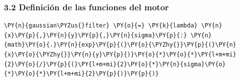 \subsubsection{3.2 Definición de las funciones del
motor}\label{definiciuxf3n-de-las-funciones-del-motor}

    \begin{tcolorbox}[breakable, size=fbox, boxrule=1pt, pad at break*=1mm,colback=cellbackground, colframe=cellborder]
\begin{Verbatim}[commandchars=\\\{\}]
\PY{n}{gaussian\PYZus{}filter} \PY{o}{=} \PY{k}{lambda} \PY{n}{x}\PY{p}{,}\PY{n}{y}\PY{p}{,}\PY{n}{sigma}\PY{p}{:} \PY{n}{math}\PY{o}{.}\PY{n}{exp}\PY{p}{(}\PY{o}{\PYZhy{}}\PY{p}{(}\PY{n}{x}\PY{o}{\PYZhy{}}\PY{n}{y}\PY{p}{)}\PY{o}{*}\PY{o}{*}\PY{l+m+mi}{2}\PY{o}{/}\PY{p}{(}\PY{l+m+mi}{2}\PY{o}{*}\PY{n}{sigma}\PY{o}{*}\PY{o}{*}\PY{l+m+mi}{2}\PY{p}{)}\PY{p}{)}
\end{Verbatim}
\end{tcolorbox}

